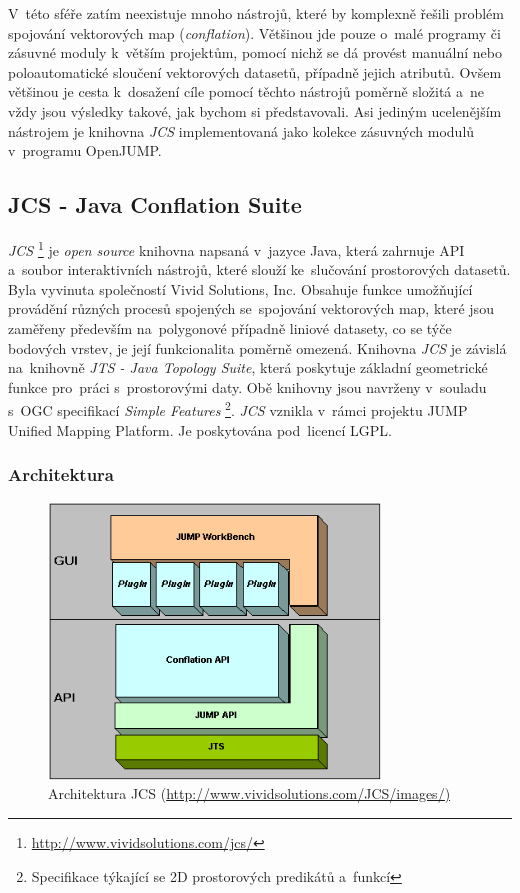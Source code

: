 V~této sféře zatím neexistuje mnoho nástrojů, které by komplexně řešili problém
spojování vektorových map (\textit{conflation}). Většinou jde pouze o~malé 
programy či zásuvné moduly k~větším projektům, pomocí nichž se dá provést manuální
nebo poloautomatické sloučení vektorových datasetů, případně jejich atributů. 
Ovšem většinou je cesta k~dosažení cíle pomocí těchto nástrojů poměrně složitá 
a~ne vždy jsou výsledky takové, jak bychom si představovali. Asi jediným 
ucelenějším nástrojem je knihovna \textit{JCS} implementovaná jako kolekce 
zásuvných modulů v~programu OpenJUMP.

\subsection{JCS - Java Conflation Suite}
\label{JCS}

\textit{JCS} \footnote{\url{http://www.vividsolutions.com/jcs/}}
 je \textit{open source} knihovna napsaná v~jazyce Java, která 
zahrnuje API a~soubor interaktivních nástrojů, které slouží ke~slučování 
prostorových datasetů. Byla vyvinuta společností Vivid Solutions, Inc. 
Obsahuje funkce umožňující provádění různých procesů spojených se~spojování
vektorových map, které jsou zaměřeny především na~polygonové případně liniové
datasety, co se týče bodových vrstev, je její funkcionalita poměrně omezená. 
Knihovna \textit{JCS} je závislá na~knihovně \textit{JTS - Java Topology Suite},
která poskytuje základní geometrické funkce pro~práci s~prostorovými
daty. Obě knihovny jsou navrženy v~souladu s~OGC specifikací 
\textit{Simple Features} \footnote{Specifikace týkající se 2D prostorových 
predikátů a~funkcí}. \textit{JCS} vznikla v~rámci projektu JUMP Unified 
Mapping Platform. Je poskytována pod~licencí LGPL.

\subsubsection{Architektura}
\label{jcspic}
  \begin{figure}[hbt]
    \centering
      \includegraphics[width=250pt]{./pictures/JCS_Architecture.png}
      \caption{Architektura JCS 
	  (\url{http://www.vividsolutions.com/JCS/images/)}}
      \label{fig:architektura}
  \end{figure}


